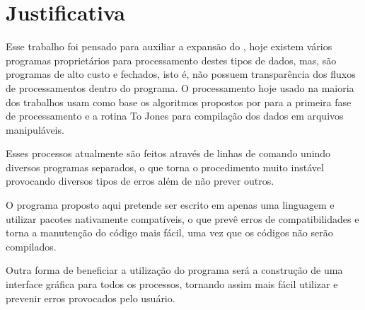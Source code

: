 \chapter{Justificativa}
\label{cap-justificativa}

    Esse trabalho foi pensado para auxiliar a expansão do \MT, hoje existem vários programas proprietários para processamento destes tipos de dados, mas, são programas de alto custo e fechados, isto é, não possuem transparência dos fluxos de processamentos dentro do programa. O processamento hoje usado na maioria dos trabalhos usam como base os algoritmos propostos por \citeauthor{egbert97} para a primeira fase de processamento e a rotina To Jones \cite{egbert97} para compilação dos dados em arquivos manipuláveis.
    
    Esses processos atualmente são feitos através de linhas de comando unindo diversos programas separados, o que torna o procedimento muito instável provocando diversos tipos de erros além de não prever outros. %
    
    O programa proposto aqui pretende ser escrito em apenas uma linguagem e utilizar pacotes nativamente compatíveis, o que prevê erros de compatibilidades e torna a manutenção do código mais fácil, uma vez que os códigos não serão compilados.
    
    Outra forma de beneficiar a utilização do programa será a construção de uma interface gráfica para todos os processos, tornando assim mais fácil utilizar e prevenir erros provocados pelo usuário.    
    
    
